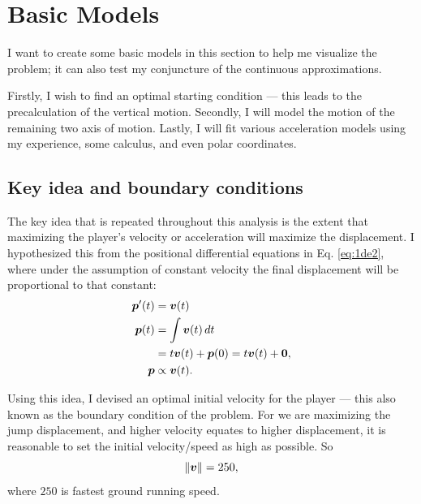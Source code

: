 
\section{Basic Models}
I want to create some basic models in this section to  help me visualize the problem; it can also test my conjuncture of the continuous approximations.

Firstly, I wish to find an optimal starting condition --- this leads to the precalculation of the vertical motion. Secondly, I will model the motion of the remaining two axis of motion. Lastly, I will fit various acceleration models using my experience, some calculus, and even polar coordinates.

\subsection{Key idea and boundary conditions}
The key idea that is repeated throughout this analysis is the extent that maximizing the player's velocity or acceleration will maximize the displacement. I hypothesized this from the positional differential equations in Eq. \ref{eq:1de2}, where under the assumption of constant velocity the final displacement will be proportional to that constant:
\begin{align*}
    \boldsymbol{p}'(t) &= \boldsymbol{v}(t)\\
    \boldsymbol{p}(t) &= \int \boldsymbol{v}(t) \, dt\\
    &= t\boldsymbol{v}(t) + \boldsymbol{p}(0) = t\boldsymbol{v}(t) + \boldsymbol{0},\\
    \boldsymbol{p} &\propto \boldsymbol{v}(t).
\end{align*}

Using this idea, I devised an optimal initial velocity for the player --- this also known as the boundary condition of the problem. For we are maximizing the jump displacement, and higher velocity equates to higher displacement, it is reasonable to set the initial velocity/speed as high as possible. So
\[
    \|\boldsymbol{v}\| = 250,
\]
where $250$ is fastest ground running speed.


